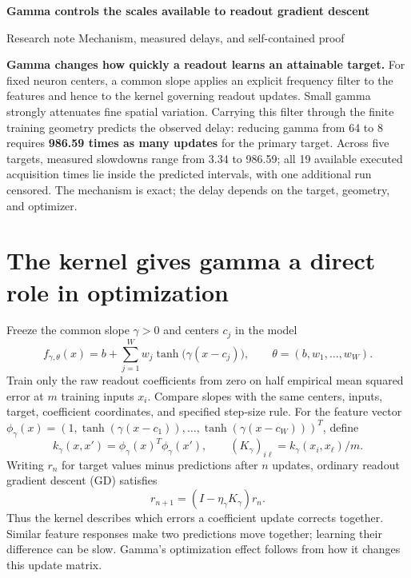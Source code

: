 \documentclass[11pt]{article}
\theoremstyle{definition}
\begin{document}
\thispagestyle{plain}
{\color{ink}\fontsize{23}{27}\selectfont\bfseries
Gamma controls the scales available\newline
to readout gradient descent\par}
\vspace{4pt}
{\small\color{ink}Research note \quad Mechanism, measured delays, and self-contained proof}
\vspace{6pt}

\textbf{Gamma changes how quickly a readout learns an attainable target.}
For fixed neuron centers, a common slope applies an explicit frequency filter
to the features and hence to the kernel governing readout updates. Small gamma
strongly attenuates fine spatial variation. Carrying this filter through the
finite training geometry predicts the observed delay: reducing gamma from 64
to 8 requires \textbf{986.59 times as many updates} for the primary target.
Across five targets, measured slowdowns range from 3.34 to 986.59; all 19
available executed acquisition times lie inside the predicted intervals, with
one additional run censored. The mechanism is exact; the delay depends on
the target, geometry, and optimizer.

\section{The kernel gives gamma a direct role in optimization}
Freeze the common slope $\gamma>0$ and centers $c_j$ in the model
\begin{equation}
 f_{\gamma,\theta}(x)=b+\sum_{j=1}^W w_j\tanh\!\bigl(\gamma(x-c_j)\bigr),
 \qquad \theta=(b,w_1,\ldots,w_W).
\end{equation}
Train only the raw readout coefficients from zero on half empirical mean
squared error at $m$ training inputs $x_i$. Compare slopes with the same
centers, inputs, target, coefficient coordinates, and specified step-size rule.
For the feature vector
$\phi_\gamma(x)=(1,\tanh(\gamma(x-c_1)),\ldots,\tanh(\gamma(x-c_W)))^T$,
define
\begin{equation}
 k_\gamma(x,x')=\phi_\gamma(x)^T\phi_\gamma(x'),\qquad
 (K_\gamma)_{i\ell}=k_\gamma(x_i,x_\ell)/m.
\end{equation}
Writing $r_n$ for target values minus predictions after $n$ updates, ordinary
readout gradient descent (GD) satisfies
\begin{equation}\label{eq:update}
 \boxed{r_{n+1}=(I-\eta_\gamma K_\gamma)r_n.}
\end{equation}
Thus the kernel describes which errors a coefficient update corrects together.
Similar feature responses make two predictions move together; learning their
difference can be slow. Gamma's optimization effect follows from how it changes
this update matrix.
\end{document}
